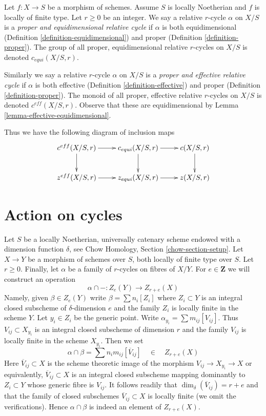 \documentclass{stacks-project}
\theoremstyle{plain}
\theoremstyle{definition}
\theoremstyle{remark}
\numberwithin{equation}{subsection}
\begin{document}
\noindent
Let $f : X \to S$ be a morphism of schemes. Assume $S$ is locally Noetherian
and $f$ is locally of finite type. Let $r \geq 0$ be an integer. We say a
relative $r$-cycle $\alpha$ on $X/S$ is a {\it proper and equidimensional
relative cycle} if $\alpha$ is both equidimensional
(Definition \ref{definition-equidimensional})
and proper (Definition \ref{definition-proper}).
The group of all proper, equidimensional relative $r$-cycles on $X/S$ is
denoted $c_{equi}(X/S, r)$.

\medskip\noindent
Similarly we say a relative $r$-cycle $\alpha$ on $X/S$ is a
{\it proper and effective relative cycle} if $\alpha$ is both effective
(Definition \ref{definition-effective}) and proper
(Definition \ref{definition-proper}).
The monoid of all proper, effective relative $r$-cycles on $X/S$ is
denoted $c^{eff}(X/S, r)$.
Observe that these are equidimensional by
Lemma \ref{lemma-effective-equidimensional}.

\medskip\noindent
Thus we have the following diagram of inclusion maps
$$
\xymatrix{
c^{eff}(X/S, r) \ar[r] \ar[d] &
c_{equi}(X/S, r) \ar[r] \ar[d] &
c(X/S, r) \ar[d] \\
z^{eff}(X/S, r) \ar[r] &
z_{equi}(X/S, r) \ar[r] &
z(X/S, r)
}
$$



\section{Action on cycles}
\label{section-action}

\noindent
Let $S$ be a locally Noetherian, universally catenary scheme endowed
with a dimension function $\delta$, see
Chow Homology, Section \ref{chow-section-setup}.
Let $X \to Y$ be a morphism of schemes over $S$, both locally of finite
type over $S$. Let $r \geq 0$. Finally, let $\alpha$ be a family of
$r$-cycles on fibres of $X/Y$. For $e \in \mathbf{Z}$
we will construct an operation
$$
\alpha \cap - : Z_e(Y) \longrightarrow Z_{r + e}(X)
$$
Namely, given $\beta \in Z_e(Y)$ write $\beta = \sum n_i[Z_i]$
where $Z_i \subset Y$ is an integral closed subscheme of
$\delta$-dimension $e$ and the
family $Z_i$ is locally finite in the scheme $Y$.
Let $y_i \in Z_i$ be the generic point. Write
$\alpha_{y_i} = \sum m_{ij} [V_{ij}]$. Thus $V_{ij} \subset X_{y_i}$
is an integral closed subscheme of dimension $r$ and the family
$V_{ij}$ is locally finite in the scheme $X_{y_i}$.
Then we set
$$
\alpha \cap \beta = \sum n_i m_{ij} [\overline{V}_{ij}]
\quad\in\quad
Z_{r + e}(X)
$$
Here $\overline{V}_{ij} \subset X$ is the scheme theoretic image
of the morphism $V_{ij} \to X_{y_i} \to X$ or equivalently,
$\overline{V}_{ij} \subset X$ is an integral closed subscheme
mapping dominantly to $Z_i \subset Y$ whose generic fibre is $V_{ij}$.
It follows readily that $\dim_\delta(\overline{V}_{ij}) = r + e$
and that the family of closed subschemes
$\overline{V}_{ij} \subset X$ is locally finite (we omit the verifications).
Hence $\alpha \cap \beta$ is indeed an element of $Z_{r + e}(X)$.
\end{document}
